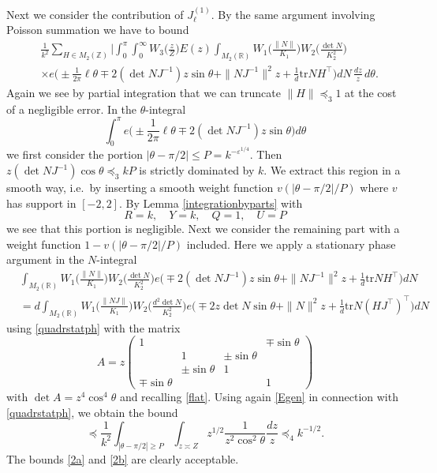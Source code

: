 \documentclass[11pt]{amsart}
\numberwithin{equation}{section}
\theoremstyle{plain}
\theoremstyle{definition}
\renewcommand{\geq}{\geqslant}
\renewcommand{\leq}{\le}
\numberwithin{equation}{section}
\begin{document}
Next we consider the contribution of $J_{\ell}^{(1)}$. By the same argument involving Poisson summation we have to bound
\begin{align}
&\frac{1}{k^2} \sum_{H \in M_2(\mathbb{Z})}  \Big|  \int_0^{\pi} \int_0^{\infty} W_3\Big(\frac{z}{Z}\Big)E(z)  
    \int_{M_2(\mathbb{R})} W_1\Big(\frac{\| N \|}{K_1}\Big) W_2\Big(\frac{\det N}{K_2^2}\Big)  \\
    & \times e\Big( \pm\frac{1}{2\pi}  \ell \theta\mp 2  (\det N J^{-1}) z \sin\theta  +\| N J^{-1}\|^2 z +\frac{1}{d}\text{tr} N H^{\top}\Big) dN \,  \frac{dz}{z}\, d\theta . 
\end{align}
Again we see by partial integration that we can truncate $\| H \| \preccurlyeq_{3} 1$ at the cost of a negligible error. In the $\theta$-integral
$$\int_0^{\pi} e\Big( \pm\frac{1}{2\pi}  \ell \theta\mp 2 ( \det N J^{-1})z \sin\theta \Big) d\theta $$
 we first consider  the portion $|\theta - \pi/2| \leq P = k^{-\varepsilon^{1/4}}$. Then  $z (\det NJ^{-1}) \cos \theta \preccurlyeq_{3} kP$ is strictly dominated by $k$. 
We extract this 
region in a smooth way, i.e.\ by inserting a smooth weight function $v( |\theta - \pi/2| /P)$ where $v$ has support in $[-2, 2]$. By Lemma  \ref{integrationbyparts} with 
$$R = k, \quad Y = k, \quad Q = 1, \quad U = P$$
we see that this portion  is negligible. Next we consider the remaining part with a weight function  $1-v( |\theta - \pi/2|/P)$ included. Here we apply a stationary phase argument in the $N$-integral 
\begin{align}
&   \int_{M_2(\mathbb{R})} W_1\Big(\frac{\| N \|}{K_1}\Big) W_2\Big(\frac{\det N}{K_2^2}\Big)  e\Big( \mp 2 (\det NJ^{-1}) z \sin\theta  +\| N J^{-1}\|^2 z + \frac{1}{d}\text{tr} N H^{\top}\Big) dN\\
     & = d\int_{M_2(\mathbb{R})} W_1\Big(\frac{\| N J \|}{K_1}\Big) W_2\Big(\frac{d^2 \det N}{K_2^2}\Big)  e\Big( \mp 2z \det N   \sin\theta  +\| N  \|^2 z +\frac{1}{d}\text{tr} N (HJ^{\top})^{\top}\Big) dN
\end{align}
using \eqref{quadrstatph} with the matrix
\[A = z \left( \begin{matrix} 1 & & & \mp\sin\theta \\ & 1& \pm \sin\theta & \\ & \pm \sin\theta & 1 \\ \mp \sin\theta & & & 1\end{matrix}\right)\]
with  $ \det A  =  z^4 \cos^4\theta $ and recalling \eqref{flat}.  %
Using again \eqref{Egen} in connection with \eqref{quadrstatph}, we obtain the bound
\begin{equation}\label{2b}
\preccurlyeq  \frac{1}{k^2} \int_{ |\theta - \pi/2| \geq P} \int_{z \asymp Z} z^{1/2} \frac{1}{ z^2 \cos^2\theta}\frac{dz}{z} \preccurlyeq_{4} k^{-1/2}.
\end{equation}
The bounds \eqref{2a} and \eqref{2b} are clearly acceptable. 
\end{document}
